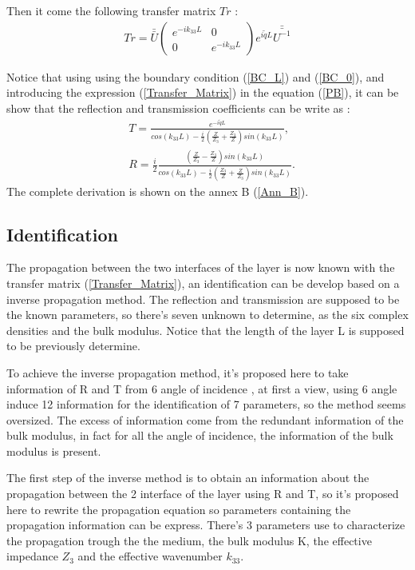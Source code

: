 \documentclass{article}
\begin{document}
    Then it come the following transfer matrix $Tr$ :
        \begin{align}
    Tr=\bar{\bar{U}}\begin{pmatrix}
    e^{-ik_{33}L} & 0 \\ 0 & e^{-ik_{33}L} 
    \end{pmatrix} e^{i\tilde{q}L}\bar{\bar{U^{-1}}}\label{Transfer_Matrix}
    \end{align}
    
    Notice that using using the boundary condition (\ref{BC_L}) and (\ref{BC_0}), and introducing the expression (\ref{Transfer_Matrix}) in the equation  (\ref{PB}), it can be show that the reflection and transmission coefficients can be write as :
        \begin{align}
    &T=\frac{e^{-i\tilde{q}L}}{cos(k_{33}L)-\frac{i}{2}(\frac{Z}{Z_3}+\frac{Z_3}{Z})sin(k_{33}L)}\label{Transmission},\\ 
    &R=\frac{i}{2} \frac{(\frac{Z}{Z_3}-\frac{Z_3}{Z})sin(k_{33}L)}{cos(k_{33}L)-\frac{i}{2}(\frac{Z_3}{Z}+\frac{Z}{Z_3})sin(k_{33}L)}\label{Reflexion}. 
      \end{align}
      The complete derivation is shown on the annex B (\ref{Ann_B}).

\subsection{Identification}
    The propagation between the two interfaces of the layer is now known with the transfer matrix (\ref{Transfer_Matrix}), an identification can be develop based on a inverse propagation method. The reflection and transmission are supposed to be the known parameters, so there's seven unknown to determine, as the six complex densities and the bulk modulus. Notice that the length of the layer L is supposed to be previously determine.
    
    To achieve the inverse propagation method, it's proposed here to take information  of R and T from 6 angle of incidence , at first a view, using 6 angle induce 12 information for the identification of 7 parameters, so the method seems oversized. The excess of information come from the redundant information of the bulk modulus, in fact for all the angle of incidence, the information of the bulk modulus is present. 
    
    The first step of the inverse method is to obtain an information about the propagation between the 2 interface of the layer using R and T, so it's proposed here to rewrite the propagation equation so parameters containing the propagation information can be express. There's 3 parameters use to characterize the propagation trough the the medium, the bulk modulus K, the effective impedance $Z_3$ and the effective wavenumber $k_{33}$.
    
\end{document}
